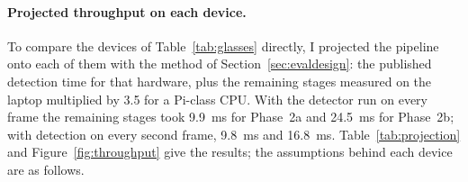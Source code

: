 \begin{table}[htbp]
\begin{singlespace}
\centering
\caption{Time to detect faces in one frame with a nano-sized YOLO model on different
processors. The laptop figures are my measurements; the others are published benchmarks.}
\label{tab:det_hw}
\renewcommand{\arraystretch}{1.3}
\end{singlespace}
\end{table}

\paragraph{Projected throughput on each device.}
To compare the devices of Table~\ref{tab:glasses} directly, I projected the pipeline onto
each of them with the method of Section~\ref{sec:evaldesign}: the published detection time
for that hardware, plus the remaining stages measured on the laptop multiplied by 3.5 for a
Pi-class CPU. With the detector run on every frame the remaining stages took 9.9~ms for
Phase~2a and 24.5~ms for Phase~2b; with detection on every second frame, 9.8~ms and
16.8~ms. Table~\ref{tab:projection} and Figure~\ref{fig:throughput} give the results; the
assumptions behind each device are as follows.

